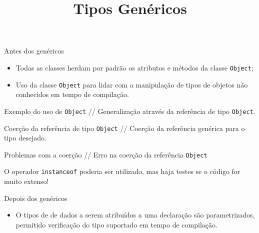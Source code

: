 


\title{Tipos Genéricos}

\frame{\maketitle}

\begin{frame}[fragile]{Antes dos genéricos}
  \begin{itemize}
  \item Todas as classes herdam por padrão os atributos e métodos da
    classe {\tt \alert{Object}};
  \item Uso da classe {\tt \alert{Object}} para lidar com a manipulação de
    tipos de objetos não conhecidos em tempo de compilação.
  \end{itemize}

\end{frame}

\begin{frame}[fragile]{Exemplo do uso de {\tt Object}}{}
  {\small // Generalização através da referência de tipo {\tt Object}.}
  
\end{frame}

\begin{frame}[fragile]{Coerção da referência de tipo {\tt Object}}{}
  {\small // Coerção da referência genérica para o tipo desejado.}
    
\end{frame}


\begin{frame}[fragile]{Problemas com a coerção}{}
  {\small // Erro na coerção da referência {\tt Object}}
  

  {\small O operador {\tt instanceof} poderia ser utilizado, mas haja
    testes se o código for muito extenso!}
\end{frame}

\begin{frame}[fragile]{Depois dos genéricos}{}
  \begin{itemize}
  \item O tipos de de dados a serem atribuídos a uma
    \alert{declaração} são parametrizados, permitido verificação do
    tipo suportado em \alert{tempo de compilação}.
  \end{itemize}
\end{frame}

